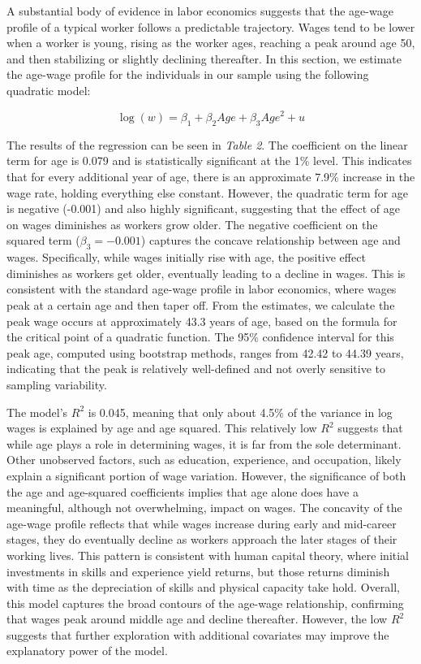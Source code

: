 \documentclass[11pt,a4paper,onecolumn]{article}
\begin{document}
    A substantial body of evidence in labor economics suggests that the age-wage profile of a typical worker follows a predictable trajectory. Wages tend to be lower when a worker is young, rising as the worker ages, reaching a peak around age 50, and then stabilizing or slightly declining thereafter. In this section, we estimate the age-wage profile for the individuals in our sample using the following quadratic model:
    
    \begin{equation}
        \log(w) = \beta_1 + \beta_2 Age + \beta_3 {Age}^2 + u
    \end{equation}
    
    
    The results of the regression can be seen in \textit{Table 2}. The coefficient on the linear term for age is 0.079 and is statistically significant at the 1\% level. This indicates that for every additional year of age, there is an approximate 7.9\% increase in the wage rate, holding everything else constant. However, the quadratic term for age is negative (-0.001) and also highly significant, suggesting that the effect of age on wages diminishes as workers grow older. The negative coefficient on the squared term ($\beta_3 = -0.001$) captures the concave relationship between age and wages. Specifically, while wages initially rise with age, the positive effect diminishes as workers get older, eventually leading to a decline in wages. This is consistent with the standard age-wage profile in labor economics, where wages peak at a certain age and then taper off. From the estimates, we calculate the peak wage occurs at approximately 43.3 years of age, based on the formula for the critical point of a quadratic function. The 95\% confidence interval for this peak age, computed using bootstrap methods, ranges from 42.42 to 44.39 years, indicating that the peak is relatively well-defined and not overly sensitive to sampling variability.
    
    
    The model's $R^2$ is 0.045, meaning that only about 4.5\% of the variance in log wages is explained by age and age squared. This relatively low $R^2$ suggests that while age plays a role in determining wages, it is far from the sole determinant. Other unobserved factors, such as education, experience, and occupation, likely explain a significant portion of wage variation. However, the significance of both the age and age-squared coefficients implies that age alone does have a meaningful, although not overwhelming, impact on wages. The concavity of the age-wage profile reflects that while wages increase during early and mid-career stages, they do eventually decline as workers approach the later stages of their working lives. This pattern is consistent with human capital theory, where initial investments in skills and experience yield returns, but those returns diminish with time as the depreciation of skills and physical capacity take hold. Overall, this model captures the broad contours of the age-wage relationship, confirming that wages peak around middle age and decline thereafter. However, the low $R^2$ suggests that further exploration with additional covariates may improve the explanatory power of the model.
\end{document}
